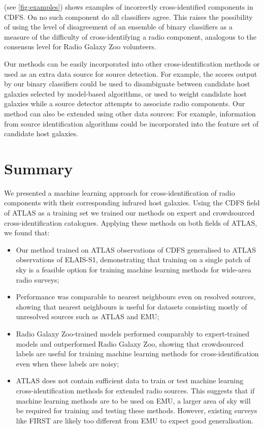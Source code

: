   { (see \autoref{fig:examples}) shows examples of incorrectly cross-identified
  components in CDFS. On no such component do all classifiers agree.
  This raises the possibility of using the level of disagreement of an
  ensemble of binary classifiers as a measure of the difficulty of cross-identifying a radio component,
  analogous to the consensus level for Radio Galaxy Zoo volunteers.}

  Our methods can be easily incorporated into other cross-identification
  methods or used as an extra data source for source detection. For
  example, the scores output by our binary classifiers could be used to
  disambiguate between candidate host
  galaxies selected by model-based algorithms, or used to weight candidate
  host galaxies while a source detector attempts to associate radio
  components. Our method can also be extended using other data sources: For
  example, information from source identification algorithms could be
  incorporated into the feature set of candidate host galaxies.

\section{Summary}

  We presented a machine learning approach for cross-identification of radio
  components with their corresponding infrared host galaxies. Using the CDFS
  field of ATLAS as a training set we trained our
  methods on expert and crowdsourced cross-identification catalogues.
  Applying these methods on both fields of ATLAS, we found that:
  \begin{itemize}
    \item Our method trained on ATLAS observations of CDFS generalised to
    ATLAS observations of ELAIS-S1, demonstrating that training on a single
    patch of sky is a feasible option for training machine learning methods
    for wide-area radio surveys;
    \item Performance was comparable to nearest neighbours even on resolved
    sources, showing that nearest neighbours is useful for datasets consisting
    mostly of unresolved sources such as ATLAS and EMU;
    \item Radio Galaxy Zoo-trained models performed comparably to
    expert-trained models and outperformed Radio Galaxy Zoo, showing that
    crowdsourced labels are useful for training machine learning methods for
    cross-identification even when these labels are noisy;
    \item ATLAS does not contain sufficient data to train or test machine
    learning cross-identification methods for extended radio sources. This
    suggests that if machine learning methods are to be used on EMU, a larger
    area of sky will be required for training and testing these methods.
    However, existing surveys like FIRST are likely too different from EMU to expect
    good generalisation.
  \end{itemize}

